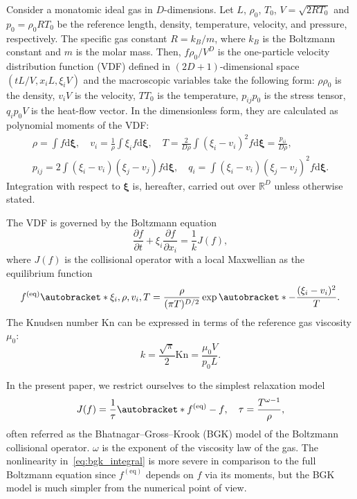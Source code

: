 \documentclass[]{elsarticle} %
\newcommand{\Kn}{\mathrm{Kn}}
\newcommand{\dd}{\mathrm{d}}
\newcommand{\pder}[2][]{\frac{\partial#1}{\partial#2}}
\DeclarePairedDelimiter\autobracket()       %
\newcommand{\br}[1]{\autobracket*{#1}}
\newcommand{\dxi}{\boldsymbol{\dd\xi}}
\newcommand{\bxi}{{\boldsymbol{\xi}}}
\newcommand{\equil}[1]{#1^\mathrm{(eq)}}
\newcommand{\refer}[1]{#1_0}
\begin{document}
{%
Consider a monatomic ideal gas in \(D\)-dimensions.
Let \(L\), \(\refer\rho\), \(\refer{T}\), \(V = \sqrt{2R\refer{T}}\) and \(\refer{p} = \refer{\rho}R\refer{T}\) be
the reference length, density, temperature, velocity, and pressure, respectively.
The specific gas constant \(R = k_B/m\), where \(k_B\) is the Boltzmann constant and \(m\) is the molar mass.
Then, \(f\refer{\rho}/V^D\) is the one-particle velocity distribution function (VDF)
defined in \((2D+1)\)-dimensional space \((tL/V, x_iL, \xi_iV)\) and
the macroscopic variables take the following form:
\(\rho\refer{\rho}\) is the density, \(v_iV\) is the velocity, \(T\refer{T}\) is the temperature,
\(p_{ij}\refer{p}\) is the stress tensor, \(q_i\refer{p}V\) is the heat-flow vector.
In the dimensionless form, they are calculated as polynomial moments of the VDF:
\begin{equation}\label{eq:macro}
    \begin{gathered}
    \rho = \int f \dxi, \quad
    v_i = \frac1{\rho} \int \xi_i f \dxi, \quad
    T = \frac{2}{D\rho}\int(\xi_i-v_i)^2 f \dxi = \frac{p_{ii}}{D\rho}, \\
    p_{ij} = 2 \int(\xi_i-v_i)(\xi_j-v_j) f \dxi, \quad
    q_i = \int(\xi_i-v_i)(\xi_j-v_j)^2 f \dxi.
    \end{gathered}
\end{equation}
Integration with respect to \(\bxi\) is, hereafter, carried out over \(\mathbb{R}^D\) unless otherwise stated.

The VDF is governed by the Boltzmann equation
\begin{equation}\label{eq:Boltzmann}
    \pder[f]{t} + \xi_i\pder[f]{x_i} = \frac1kJ(f),
\end{equation}
where \(J(f)\) is the collisional operator with a local Maxwellian as the equilibrium function
\begin{equation}\label{eq:equilibrium}
    \equil{f}\br{\xi_i,\rho,v_i,T} = \frac{\rho}{(\pi T)^{D/2}}\exp\br{-\frac{(\xi_i - v_i)^2}T}.
\end{equation}
The Knudsen number \(\Kn\) can be expressed in terms of the reference gas viscosity \(\refer\mu\):
\begin{equation}\label{eq:Knudsen_number}
    k = \frac{\sqrt\pi}2\Kn = \frac{\refer\mu V}{\refer{p}L}.
\end{equation}

In the present paper, we restrict ourselves to the simplest relaxation model~\cite{Krook1954, Welander1954}
\begin{equation}\label{eq:bgk_integral}
    J(f) = \frac1\tau\br{\equil{f}-f}, \quad \tau = \frac{T^{\omega-1}}{\rho},
\end{equation}
often referred as the Bhatnagar--Gross--Krook (BGK) model of the Boltzmann collisional operator.
\(\omega\) is the exponent of the viscosity law of the gas.
The nonlinearity in~\eqref{eq:bgk_integral} is more severe in comparison to the full Boltzmann equation
since \(\equil{f}\) depends on \(f\) via its moments,
but the BGK model is much simpler from the numerical point of view.

}
\end{document}
